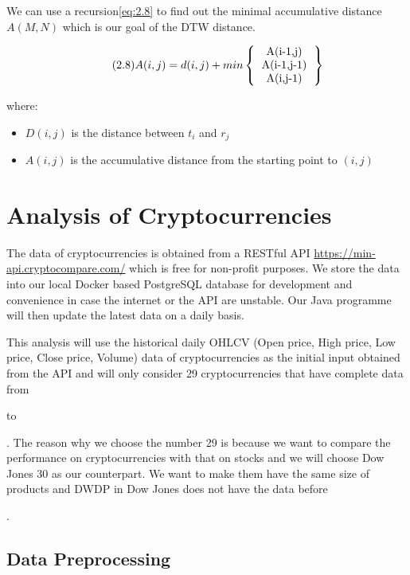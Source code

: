 \documentclass[11pt]{article} %
\theoremstyle{plain}
\theoremstyle{definition}
\begin{document}
We can use a recursion\eqref{eq:2.8} to find out the minimal accumulative distance $A(M,N)$ which is our goal of the DTW distance\cite{wiki/dtw:2018}.

{
    \begin{equation}
        \label{eq:2.8}
        \tag{2.8}
        {A(i,j) = d(i,j) + min
        \left \{
            \begin{tabular}{c}
                A(i-1,j) \\
                A(i-1,j-1) \\
                A(i,j-1)
            \end{tabular}
        \right \}}
    \end{equation}

    \footnotesize
    where:
    \begin{itemize}[label=-, leftmargin=4em, itemsep=0.1em]
        \item $D(i,j)$ is the distance between $t_i$ and $r_j$
        \item $A(i,j)$ is the accumulative distance from the starting point to $(i,j)$
    \end{itemize}
}

\section{Analysis of Cryptocurrencies}

The data of cryptocurrencies is obtained from a RESTful API \url{https://min-api.cryptocompare.com/} which is free for non-profit purposes. We store the data into our local Docker based PostgreSQL database for development and convenience in case the internet or the API are unstable. Our Java programme will then update the latest data on a daily basis.

This analysis will use the historical daily OHLCV (Open price, High price, Low price, Close price, Volume) data of cryptocurrencies as the initial input obtained from the API and will only consider 29 cryptocurrencies that have complete data from \date{1st January 2016} to \date{31st July 2018}. The reason why we choose the number 29 is because we want to compare the performance on cryptocurrencies with that on stocks and we will choose Dow Jones 30 as our counterpart. We want to make them have the same size of products and DWDP in Dow Jones does not have the data before \date{1st September 2017}.

\subsection{Data Preprocessing}
\end{document}
